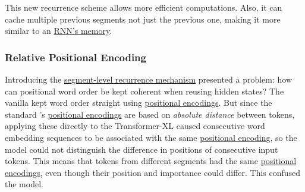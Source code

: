 This new recurrence scheme allows more efficient computations. Also, it can cache multiple previous segments not just the previous one, making it more similar to an \hyperref[sec:RNN]{RNN's memory}. 


\subsubsection{Relative Positional Encoding} \label{sec:RelativePosEnc}

Introducing the \hyperref[sec:SegmentLevelRec]{segment-level recurrence mechanism} presented a problem: how can positional word order be kept coherent when reusing hidden states? The vanilla  kept word order straight using \hyperref[sec:PosEncodings]{positional encodings}. But since the standard 's \hyperref[sec:PosEncodings]{positional encodings} are based on \emph{absolute distance} between tokens, applying these directly to the Transformer-XL caused consecutive word embedding sequences to be associated with the same \hyperref[sec:PosEncodings]{positional encoding}, so the model could not distinguish the difference in positions of consecutive input tokens. This means that tokens from different segments had the same \hyperref[sec:PosEncodings]{positional encodings}, even though their position and importance could differ. This confused the model. 

